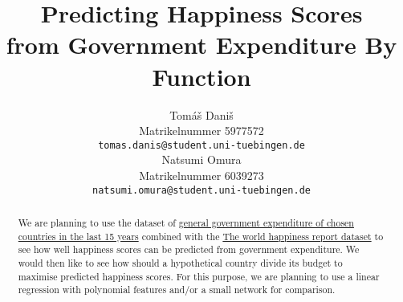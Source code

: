 \documentclass{article}
\title{Predicting Happiness Scores\\ from Government Expenditure By Function}
\author{%
  Tomáš Daniš\\
  Matrikelnummer 5977572\\
  \texttt{tomas.danis@student.uni-tuebingen.de} \\
  \And
  Natsumi Omura\\
  Matrikelnummer 6039273\\
  \texttt{natsumi.omura@student.uni-tuebingen.de} \\
}
\begin{document}
\maketitle

\begin{abstract}
  We are planning to use the dataset of \href{https://stats.oecd.org/Index.aspx?datasetcode=SNA_TABLE11#}{general government expenditure of chosen countries in the last 15 years} combined with the \href{https://happiness-report.s3.amazonaws.com/2021/DataPanelWHR2021C2.xls}{The world happiness report dataset} to see how well happiness scores can be predicted from government expenditure. We would then like to see how should a hypothetical country divide its budget to maximise predicted happiness scores. For this purpose, we are planning to use a linear regression with polynomial features and/or a small network for comparison.
\end{abstract}
\end{document}
